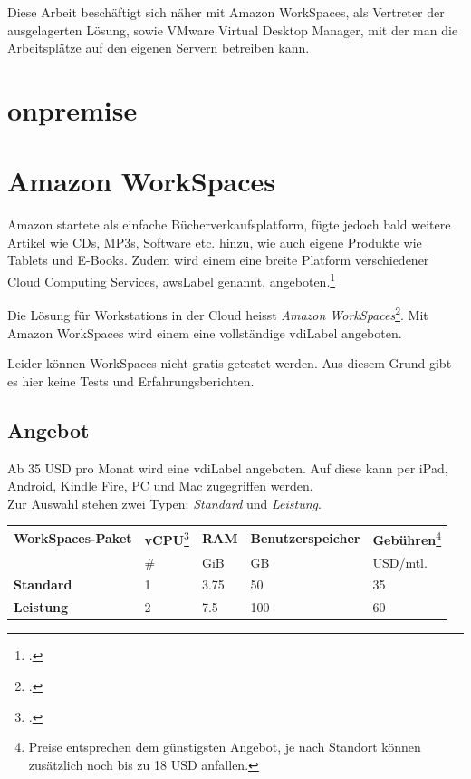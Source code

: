 Diese Arbeit beschäftigt sich näher mit Amazon WorkSpaces, als Vertreter der ausgelagerten Lösung, sowie VMware Virtual Desktop Manager, mit der man die Arbeitsplätze auf den eigenen Servern betreiben kann.

\section{onpremise}

\section{Amazon WorkSpaces}

Amazon startete als einfache Bücherverkaufsplatform, fügte jedoch bald weitere Artikel wie CDs, MP3s, Software etc. hinzu, wie auch eigene Produkte wie Tablets und E-Books.
Zudem wird einem eine breite Platform verschiedener Cloud Computing Services, \Gls{awsLabel} genannt, angeboten.\footcite{Amazon.com_-_Wikipedia_the_free_encyclopedia_2014-11-15}

Die Lösung für Workstations in der Cloud heisst \textit{Amazon WorkSpaces}\footcite{AWS_Amazon_WorkSpaces_2014-11-03}.
Mit Amazon WorkSpaces wird einem eine vollständige \Gls{vdiLabel} angeboten.

Leider können WorkSpaces nicht gratis getestet werden. Aus diesem Grund gibt es hier keine Tests und Erfahrungsberichten.

\subsection{Angebot}
Ab 35 USD pro Monat wird eine \Gls{vdiLabel} angeboten. Auf diese kann per iPad, Android, Kindle Fire, PC und Mac zugegriffen werden.\\
Zur Auswahl stehen zwei Typen: \textit{Standard} und \textit{Leistung}.

\begin{table}[H]
	\centering
	\small\renewcommand{\arraystretch}{1.4}  
	\begin{tabularx}{0.9\textwidth}{X | Y | Y | Y | Y }
		\hline
		\textbf{WorkSpaces-Paket} & \textbf{vCPU}\footcite{Virtual_CPUs_with_Amazon_Web_Services_2014-11-15} & \textbf{RAM} & \textbf{Benutzerspeicher} & \textbf{Gebühren}\footnote{Preise entsprechen dem günstigsten Angebot, je nach Standort können zusätzlich noch bis zu 18 USD anfallen.}\\
		 & \# & GiB & GB & USD/mtl.\\
		\hline
			\textbf{Standard} & 1 & 3.75 & 50 & 35\\
			\textbf{Leistung} & 2 & 7.5 & 100 & 60\\
		\hline
	\end{tabularx}
\end{table}

